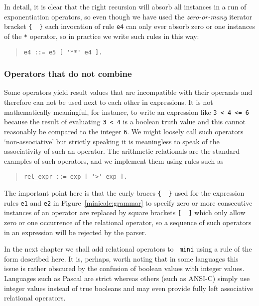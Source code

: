 {In detail, it is clear that the right recursion will absorb all instances in a run of exponentiation
operators, so even though we have used the {\em zero-or-many} iterator bracket \verb+{  }+
each invocation of rule {\tt e4} can only ever absorb zero or one instances of the {\tt **}
operator, so in practice we write such rules in this way:
\begin{quote}
\small
\begin{verbatim}
e4 ::= e5 [ '**' e4 ].
\end{verbatim}
\end{quote}

\subsubsection{Operators that do not combine}
Some operators yield result values that are incompatible with their
operands and therefore can not be used next to each other in expressions. 
It is not mathematically meaningful, for instance, to write an expression
like \verb|3 < 4 <= 6| because the result of evaluating \verb|3 < 4| is
a boolean truth value and this cannot reasonably be compared to the
integer \verb+6+. We might loosely call such operators `non-associative'
but strictly speaking it is meaningless to speak of the associativity of such 
an operator. The arithmetic relationals are the standard examples of such 
operators, and we implement them using rules such as
\begin{quote}
\small
\begin{verbatim}
rel_expr ::= exp [ '>' exp ].
\end{verbatim}
\end{quote}
The important point here is that the curly braces \verb+{  }+ used for
the expression rules {\tt e1} and {\tt e2} in
Figure~\ref{minicalc:grammar} to specify zero or more consecutive
instances of an operator are replaced by square brackets \verb+[  ]+
which only allow zero or one occurrence of the relational operator,
so a sequence of such operators in an expression will be rejected by the
parser. 

In the next chapter we shall add relational operators to {\tt
mini} using a rule of the form described here. It is, perhaps, worth
noting that in some languages this issue is rather obscured by the
confusion of boolean values with integer values. Languages such as
Pascal are strict whereas others (such as ANSI-C) simply use
integer values instead of  true booleans and may even provide fully left
associative relational operators.

}
